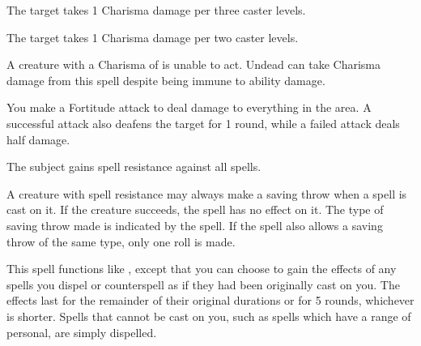 \begin{spellhealthy}
    The target takes 1 Charisma damage per three caster levels.
\end{spellhealthy}
\begin{spellblood}
    The target takes 1 Charisma damage per two caster levels.
\end{spellblood}
\begin{spellnotes}
    A creature with a Charisma of  is unable to act. Undead can take Charisma damage from this spell despite being immune to ability damage. 
\end{spellnotes}

\begin{spelleffect}
    You make a Fortitude attack to deal damage to everything in the area. A successful attack also deafens the target for 1 round, while a failed attack deals half damage.
\end{spelleffect}

\spelldur{\durshort}
\begin{spelleffect}
    The subject gains spell resistance against all spells.
\end{spelleffect}
\begin{spellnotes}
    A creature with spell resistance may always make a saving throw when a spell is cast on it. If the creature succeeds, the spell has no effect on it. The type of saving throw made is indicated by the spell. If the spell also allows a saving throw of the same type, only one roll is made.
\end{spellnotes}

\begin{spelleffect}
    This spell functions like , except that you can choose to gain the effects of any spells you dispel or counterspell as if they had been originally cast on you. The effects last for the remainder of their original durations or for 5 rounds, whichever is shorter. Spells that cannot be cast on you, such as spells which have a range of personal, are simply dispelled.
\end{spelleffect}

